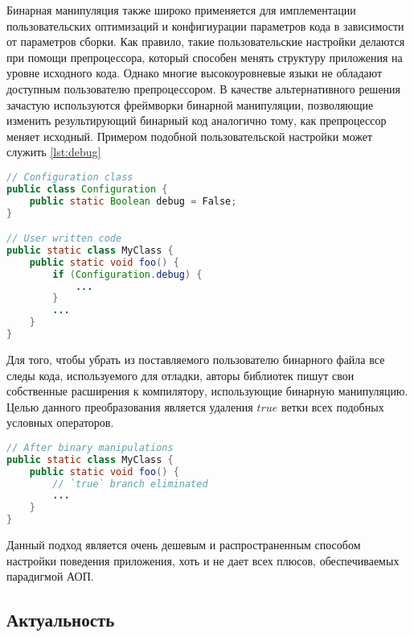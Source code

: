 Бинарная манипуляция также широко применяется для имплементации пользовательских оптимизаций и конфигиурации параметров кода в зависимости от параметров сборки. Как правило, такие пользовательские настройки делаются при помощи препроцессора, который способен менять структуру приложения на уровне исходного кода. Однако многие высокоуровневые языки не обладают доступным пользователю препроцессором. В качестве альтернативного решения зачастую используются фреймворки бинарной манипуляции, позволяющие изменить результирующий бинарный код аналогично тому, как препроцессор меняет исходный. Примером подобной пользовательской настройки может служить \autoref{lst:debug}

\begin{lstlisting}[language=Java, caption=Пример использования класса с конфигурацией проекта, label=lst:debug]
// Configuration class
public class Configuration {
    public static Boolean debug = False;
}

// User written code
public static class MyClass {
    public static void foo() {
        if (Configuration.debug) {
            ...
        }
        ...
    }
}
\end{lstlisting}

Для того, чтобы убрать из поставляемого пользователю бинарного файла все следы кода, используемого для отладки, авторы библиотек пишут свои собственные расширения к компилятору, использующие бинарную манипуляцию. Целью данного преобразования является удаления $true$ ветки всех подобных условных операторов.

\begin{lstlisting}[language=Java, caption=Результат работы преобразования, label=lst:debug]
// After binary manipulations
public static class MyClass {
    public static void foo() {
        // `true` branch eliminated
        ...
    }
}
\end{lstlisting}

Данный подход является очень дешевым и распространенным способом настройки поведения приложения, хоть и не дает всех плюсов, обеспечиваемых парадигмой АОП.

\subsection{Актуальность}

